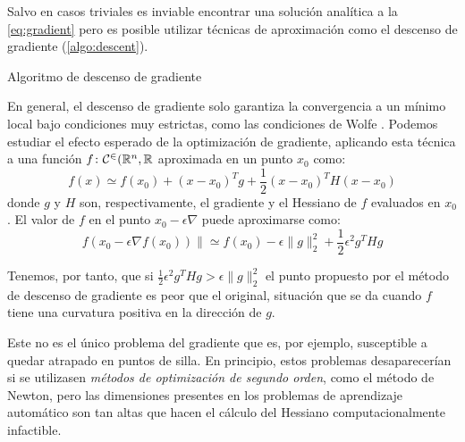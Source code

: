 Salvo en casos triviales es inviable encontrar una solución analítica a la \cref{eq:gradient} pero es posible utilizar técnicas de aproximación como el descenso de gradiente (\cref{algo:descent}).

\begin{algorithm}
    \SetAlgoLined
    \caption{Algoritmo de descenso de gradiente}
    \label{algo:descent}
\end{algorithm}

En general, el descenso de gradiente solo garantiza la convergencia a un mínimo local bajo condiciones muy estrictas, como las condiciones de Wolfe \cite{nocedal2006}. Podemos estudiar el efecto esperado de la optimización de gradiente, aplicando esta técnica a una función \( f \colon \mathcal{C^2}(\mathbb{R}^{n}, \mathbb{R} \) aproximada en un punto \( x_{0} \) como:
\[
    f(x) \simeq f(x_{0}) + (x - x_{0})^T g + \frac{1}{2} (x - x_{0})^T H (x-x_{0})
\]
donde \( g \) y \( H \) son, respectivamente, el gradiente y  el Hessiano de \( f \) evaluados en \( x_{0} \). El valor de \( f \) en el punto \( x_{0} - \epsilon \nabla \) puede aproximarse como:
\begin{equation} \label{eq:descent}
    f \left( x_{0} - \epsilon \nabla f(x_{0}) \right) \| \simeq f(x_{0}) - \epsilon \| g \|_2^2 +  \frac{1}{2} \epsilon^2 g^T Hg
\end{equation}

Tenemos, por tanto, que si \( \frac{1}{2} \epsilon^2 g^T Hg > \epsilon \| g \|_2^2 \) el punto propuesto por el método de descenso de gradiente es peor que el original, situación que se da cuando \( f \) tiene una curvatura positiva en la dirección de \( g \). 

Este no es el único problema del gradiente que es, por ejemplo, susceptible a quedar atrapado en puntos de silla. En principio, estos problemas desaparecerían si se utilizasen \textit{métodos de optimización de segundo orden}, como el método de Newton, pero las dimensiones presentes en los problemas de aprendizaje automático son tan altas que hacen el cálculo del Hessiano computacionalmente infactible.

